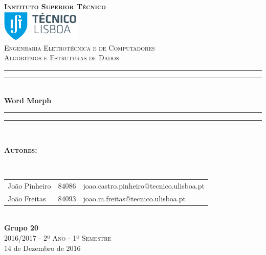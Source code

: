 \documentclass[18pt]{article}
\begin{document}
\begin{titlepage}

\thispagestyle{empty}
\newcommand{\HRule}{\rule{\linewidth}{0.5mm}} %
\center
\textsc{\bfseries\LARGE Instituto Superior Técnico}\\[1cm] %
\includegraphics[height=1.5cm]{IST_Logo.pdf}\\[2.5cm]
\textsc{\Large Engenharia Eletrotécnica e de Computadores}\\[0.5cm] %
\textsc{\large Algoritmos e Estruturas de Dados}\\[0.5cm] %

\rule{\textwidth}{1.6pt}\vspace*{-\baselineskip}\vspace*{2pt} %
\rule{\textwidth}{0.4pt}\\[\baselineskip] %

{\Huge \bfseries Word Morph}\\[0.2cm]

\rule{\textwidth}{0.4pt}\vspace*{-\baselineskip}\vspace{3.2pt} %
\rule{\textwidth}{1.6pt}\\[1.5cm]


\begin{minipage}{0.9\textwidth}
	\begin{flushleft} \large
		\begin{Large}\bfseries\textsc{Autores:}\end{Large}\\[0.4cm]
		\begin{tabular}{l l l}

			João Pinheiro & 84086 & \normalsize joao.castro.pinheiro@tecnico.ulisboa.pt \\
			João Freitas  & 84093 & \normalsize joao.m.freitas@tecnico.ulisboa.pt \\

		\end{tabular}
	\end{flushleft}
\end{minipage}\\[0.5cm]


{\bfseries Grupo 20}\\[1cm]
\large\textsc{ 2016/2017 - 2º Ano - 1º Semestre}\\
\large 14 de Dezembro de 2016\\[1cm]


\end{titlepage}
\end{document}

